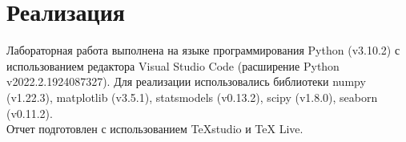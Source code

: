 \section{Реализация}
\begin{flushleft}
	Лабораторная работа выполнена на языке программирования Python (v3.10.2) с использованием редактора Visual Studio Code (расширение Python v2022.2.1924087327).
	Для реализации использовались библиотеки numpy (v1.22.3), matplotlib (v3.5.1), statsmodels (v0.13.2), scipy (v1.8.0), seaborn (v0.11.2). \\
	Отчет подготовлен с использованием TeXstudio и TeX Live.
\end{flushleft}